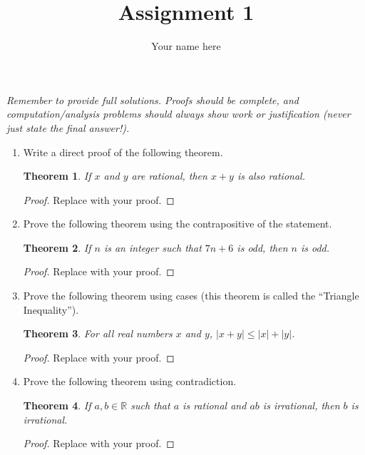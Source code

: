 \documentclass[11pt]{article}
\title{Assignment 1}
\author{Your name here}
\date{}
\newtheorem{theorem}{Theorem}
\begin{document}
\maketitle

\noindent
\textsl{Remember to provide full solutions. Proofs should be complete,
  and computation/analysis problems should always show work or
  justification (never just state the final answer!).}

\begin{enumerate}
\item Write a direct proof of the following theorem.
  \begin{theorem}
    If $x$ and $y$ are rational, then $x+y$ is also rational.
  \end{theorem}
  
  \begin{proof}
    Replace with your proof.
  \end{proof}

\item Prove the following theorem using the contrapositive of the
  statement.
  \begin{theorem}
    If $n$ is an integer such that $7n+6$ is odd, then $n$ is odd.
  \end{theorem}
  
  \begin{proof}
    Replace with your proof.
  \end{proof}

  
\item Prove the following theorem using cases (this theorem is called
  the ``Triangle Inequality'').
  \begin{theorem}
    For all real numbers $x$ and $y$, $|x+y|\leq |x|+|y|$.
  \end{theorem}
  
  \begin{proof}
    Replace with your proof.
  \end{proof}

\item Prove the following theorem using contradiction.
  \begin{theorem}
    If $a,b\in\mathbb{R}$ such that $a$ is rational and $ab$ is
    irrational, then $b$ is irrational.
  \end{theorem}
  
  \begin{proof}
    Replace with your proof.
  \end{proof}


\end{enumerate}
\end{document}
